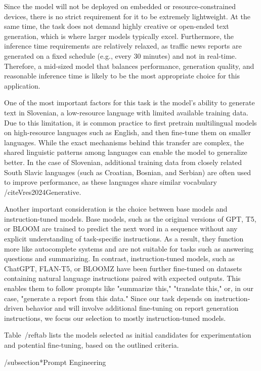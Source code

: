 Since the model will not be deployed on embedded or resource-constrained devices, there is no strict requirement for it to be extremely lightweight. At the same time, the task does not demand highly creative or open-ended text generation, which is where larger models typically excel. Furthermore, the inference time requirements are relatively relaxed, as traffic news reports are generated on a fixed schedule (e.g., every 30 minutes) and not in real-time. Therefore, a mid-sized model that balances performance, generation quality, and reasonable inference time is likely to be the most appropriate choice for this application.

One of the most important factors for this task is the model's ability to generate text in Slovenian, a low-resource language with limited available training data. Due to this limitation, it is common practice to first pretrain multilingual models on high-resource languages such as English, and then fine-tune them on smaller languages. While the exact mechanisms behind this transfer are complex, the shared linguistic patterns among languages can enable the model to generalize better. In the case of Slovenian, additional training data from closely related South Slavic languages (such as Croatian, Bosnian, and Serbian) are often used to improve performance, as these languages share similar vocabulary /cite{Vres2024Generative}.

Another important consideration is the choice between base models and instruction-tuned models. Base models, such as the original versions of GPT, T5, or BLOOM are trained to predict the next word in a sequence without any explicit understanding of task-specific instructions. As a result, they function more like autocomplete systems and are not suitable for tasks such as answering questions and summarizing. In contrast, instruction-tuned models, such as ChatGPT, FLAN-T5, or BLOOMZ have been further fine-tuned on datasets containing natural language instructions paired with expected outputs. This enables them to follow prompts like "summarize this," "translate this," or, in our case, "generate a report from this data." Since our task depends on instruction-driven behavior and will involve additional fine-tuning on report generation instructions, we focus our selection to mostly instruction-tuned models.

Table~/ref{tab} lists the models selected as initial candidates for experimentation and potential fine-tuning, based on the outlined criteria.

/subsection*{Prompt Engineering}

